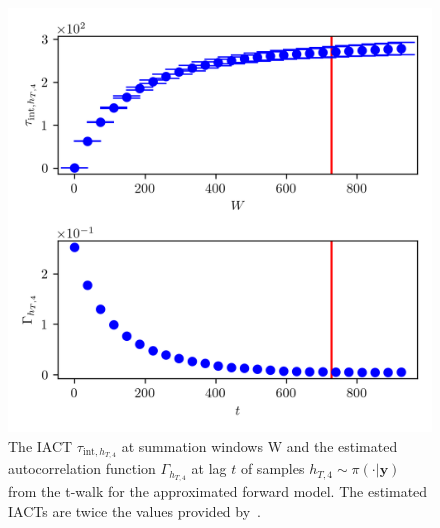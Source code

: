 \begin{figure}[ht!]
	\centering
	\includegraphics{UwerrTauIntTWalk12.png}
	\caption[IACT and autocorrelation function of samples $h_{T,4} \sim \pi(\cdot|\bm{y})$, for approximated model.]{The IACT $\tau_{\text{int},h_{T,4}}$ at summation windows W and the estimated autocorrelation function $\Gamma_{h_{T,4}}$ at lag $t$ of samples $h_{T,4} \sim \pi( \cdot| \bm{y})$ from the t-walk for the approximated forward model.
	The estimated IACTs are twice the values provided by~\cite{drikHesse, UwerrM}.}
	\label{fig:TWalkIATC13}
\end{figure}
